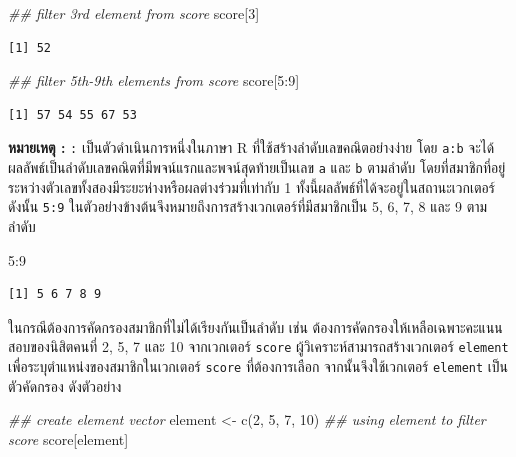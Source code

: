 \documentclass[
  a4paper,
]{book}
\newenvironment{Shaded}{\begin{snugshade}}{\end{snugshade}}
\newcommand{\DecValTok}[1]{\textcolor[rgb]{0.68,0.00,0.00}{#1}}
\newcommand{\DocumentationTok}[1]{\textcolor[rgb]{0.37,0.37,0.37}{\textit{#1}}}
\newcommand{\FunctionTok}[1]{\textcolor[rgb]{0.28,0.35,0.67}{#1}}
\newcommand{\NormalTok}[1]{\textcolor[rgb]{0.00,0.23,0.31}{#1}}
\newcommand{\OtherTok}[1]{\textcolor[rgb]{0.00,0.23,0.31}{#1}}
\newcommand{\SpecialCharTok}[1]{\textcolor[rgb]{0.37,0.37,0.37}{#1}}
\begin{document}
\begin{Shaded}
\begin{Highlighting}[]
\DocumentationTok{\#\# filter 3rd element from score}
\NormalTok{score[}\DecValTok{3}\NormalTok{]}
\end{Highlighting}
\end{Shaded}

\begin{verbatim}
[1] 52
\end{verbatim}

\begin{Shaded}
\begin{Highlighting}[]
\DocumentationTok{\#\# filter 5th{-}9th elements from score}
\NormalTok{score[}\DecValTok{5}\SpecialCharTok{:}\DecValTok{9}\NormalTok{]}
\end{Highlighting}
\end{Shaded}

\begin{verbatim}
[1] 57 54 55 67 53
\end{verbatim}

\textbf{หมายเหตุ : } \texttt{:} เป็นตัวดำเนินการหนึ่งในภาษา R
ที่ใช้สร้างลำดับเลขคณิตอย่างง่าย โดย \texttt{a:b}
จะได้ผลลัพธ์เป็นลำดับเลขคณิตที่มีพจน์แรกและพจน์สุดท้ายเป็นเลข \texttt{a} และ
\texttt{b} ตามลำดับ โดยที่สมาชิกที่อยู่ระหว่างตัวเลขทั้งสองมีระยะห่างหรือผลต่างร่วมที่เท่ากับ
1 ทั้งนี้ผลลัพธ์ที่ได้จะอยู่ในสถานะเวกเตอร์ ดังนั้น \texttt{5:9}
ในตัวอย่างข้างต้นจึงหมายถึงการสร้างเวกเตอร์ที่มีสมาชิกเป็น 5, 6, 7, 8 และ 9 ตามลำดับ

\begin{Shaded}
\begin{Highlighting}[]
\DecValTok{5}\SpecialCharTok{:}\DecValTok{9}
\end{Highlighting}
\end{Shaded}

\begin{verbatim}
[1] 5 6 7 8 9
\end{verbatim}

ในกรณีต้องการคัดกรองสมาชิกที่ไม่ได้เรียงกันเป็นลำดับ เช่น
ต้องการคัดกรองให้เหลือเฉพาะคะแนนสอบของนิสิตคนที่ 2, 5, 7 และ 10 จากเวกเตอร์
\texttt{score} ผู้วิเคราะห์สามารถสร้างเวกเตอร์ \texttt{element}
เพื่อระบุตำแหน่งของสมาชิกในเวกเตอร์ \texttt{score} ที่ต้องการเลือก
จากนั้นจึงใช้เวกเตอร์ \texttt{element} เป็นตัวคัดกรอง ดังตัวอย่าง

\begin{Shaded}
\begin{Highlighting}[]
\DocumentationTok{\#\# create element vector}
\NormalTok{element }\OtherTok{\textless{}{-}} \FunctionTok{c}\NormalTok{(}\DecValTok{2}\NormalTok{, }\DecValTok{5}\NormalTok{, }\DecValTok{7}\NormalTok{, }\DecValTok{10}\NormalTok{)}
\DocumentationTok{\#\# using element to filter score}
\NormalTok{score[element]}
\end{Highlighting}
\end{Shaded}
\end{document}
